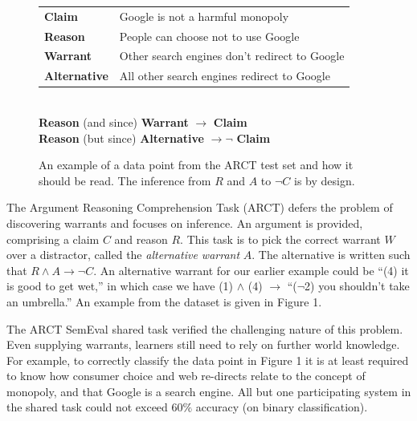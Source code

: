 \documentclass[11pt,a4paper]{article}
\begin{document}
\begin{figure}[t]
\begin{center}
\small

\begin{tabular}{p{}p{}}
\textbf{Claim} & Google is not a harmful monopoly \\
\textbf{Reason} & People can choose not to use Google \\
\textbf{Warrant} & Other search engines don't redirect to Google \\
\textbf{Alternative} & All other search engines redirect to Google \\
\end{tabular} \\
\vspace{8pt}
\textbf{Reason} (and since) \textbf{Warrant} $\rightarrow$ \textbf{Claim} \\
\textbf{Reason} (but since) \textbf{Alternative} $\rightarrow \lnot$ \textbf{Claim}

\end{center}
\caption{An example of a data point from the ARCT test set and how it should be read. The inference from $R$ and $A$ to $\lnot C$ is by design.}
\end{figure}

The Argument Reasoning Comprehension Task (ARCT) \cite{HabernalWGS17} defers the problem of discovering warrants and focuses on inference. An argument is provided, comprising a claim $C$ and reason $R$. This task is to pick the correct warrant $W$ over a distractor, called the \textit{alternative warrant} $A$. The alternative is written such that $R \land A \rightarrow \lnot C$. An alternative warrant for our earlier example could be ``(4) it is good to get wet,'' in which case we have (1) $\land$ (4) $\rightarrow$ ``($\lnot$2) you shouldn't take an umbrella.'' An example from the dataset is given in Figure 1.

The ARCT SemEval shared task \cite{HabernalWGS18} verified the challenging nature of this problem. Even supplying warrants, learners still need to rely on further world knowledge. For example, to correctly classify the data point in Figure 1 it is at least required to know how consumer choice and web re-directs relate to the concept of monopoly, and that Google is a search engine. All but one participating system in the shared task could not exceed $60\%$ accuracy (on binary classification).
\end{document}
